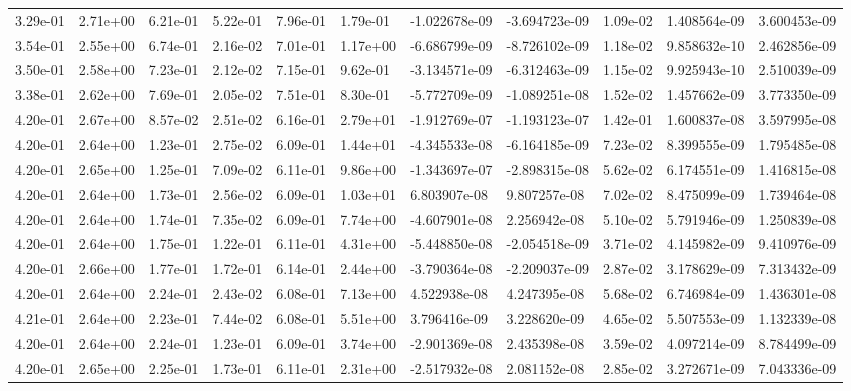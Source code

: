 \begin{longtable}{| p{} | p{} |}
3.29e-01 & 2.71e+00 & 6.21e-01 & 5.22e-01 & 7.96e-01 & 1.79e-01 & -1.022678e-09 & -3.694723e-09 &  1.09e-02 &  1.408564e-09 &  3.600453e-09 \\
3.54e-01 & 2.55e+00 & 6.74e-01 & 2.16e-02 & 7.01e-01 & 1.17e+00 & -6.686799e-09 & -8.726102e-09 &  1.18e-02 &  9.858632e-10 &  2.462856e-09 \\
3.50e-01 & 2.58e+00 & 7.23e-01 & 2.12e-02 & 7.15e-01 & 9.62e-01 & -3.134571e-09 & -6.312463e-09 &  1.15e-02 &  9.925943e-10 &  2.510039e-09 \\
3.38e-01 & 2.62e+00 & 7.69e-01 & 2.05e-02 & 7.51e-01 & 8.30e-01 & -5.772709e-09 & -1.089251e-08 &  1.52e-02 &  1.457662e-09 &  3.773350e-09 \\
4.20e-01 & 2.67e+00 & 8.57e-02 & 2.51e-02 & 6.16e-01 & 2.79e+01 & -1.912769e-07 & -1.193123e-07 &  1.42e-01 &  1.600837e-08 &  3.597995e-08 \\
4.20e-01 & 2.64e+00 & 1.23e-01 & 2.75e-02 & 6.09e-01 & 1.44e+01 & -4.345533e-08 & -6.164185e-09 &  7.23e-02 &  8.399555e-09 &  1.795485e-08 \\
4.20e-01 & 2.65e+00 & 1.25e-01 & 7.09e-02 & 6.11e-01 & 9.86e+00 & -1.343697e-07 & -2.898315e-08 &  5.62e-02 &  6.174551e-09 &  1.416815e-08 \\
4.20e-01 & 2.64e+00 & 1.73e-01 & 2.56e-02 & 6.09e-01 & 1.03e+01 &  6.803907e-08 &  9.807257e-08 &  7.02e-02 &  8.475099e-09 &  1.739464e-08 \\
4.20e-01 & 2.64e+00 & 1.74e-01 & 7.35e-02 & 6.09e-01 & 7.74e+00 & -4.607901e-08 &  2.256942e-08 &  5.10e-02 &  5.791946e-09 &  1.250839e-08 \\
4.20e-01 & 2.64e+00 & 1.75e-01 & 1.22e-01 & 6.11e-01 & 4.31e+00 & -5.448850e-08 & -2.054518e-09 &  3.71e-02 &  4.145982e-09 &  9.410976e-09 \\
4.20e-01 & 2.66e+00 & 1.77e-01 & 1.72e-01 & 6.14e-01 & 2.44e+00 & -3.790364e-08 & -2.209037e-09 &  2.87e-02 &  3.178629e-09 &  7.313432e-09 \\
4.20e-01 & 2.64e+00 & 2.24e-01 & 2.43e-02 & 6.08e-01 & 7.13e+00 &  4.522938e-08 &  4.247395e-08 &  5.68e-02 &  6.746984e-09 &  1.436301e-08 \\
4.21e-01 & 2.64e+00 & 2.23e-01 & 7.44e-02 & 6.08e-01 & 5.51e+00 &  3.796416e-09 &  3.228620e-09 &  4.65e-02 &  5.507553e-09 &  1.132339e-08 \\
4.20e-01 & 2.64e+00 & 2.24e-01 & 1.23e-01 & 6.09e-01 & 3.74e+00 & -2.901369e-08 &  2.435398e-08 &  3.59e-02 &  4.097214e-09 &  8.784499e-09 \\
4.20e-01 & 2.65e+00 & 2.25e-01 & 1.73e-01 & 6.11e-01 & 2.31e+00 & -2.517932e-08 &  2.081152e-08 &  2.85e-02 &  3.272671e-09 &  7.043336e-09 \\

\end{longtable}
